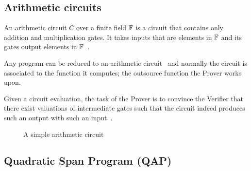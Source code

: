 \subsection{Arithmetic circuits}
\label{zkp:snarks:circuits}

An arithmetic circuit $C$ over a finite field $\mathbb{F}$ is a circuit that contains
only addition and multiplication gates. It takes inputs that are elements in $\mathbb{F}$ and its gates output elements in $\mathbb{F}$~\cite{184425, zcash}.

Any program  can be reduced to  an arithmetic circuit~\cite{pankova_succinct_2013, 10.1007/978-3-642-40084-1_6} and normally the circuit is associated to the function it computes; the outsource function the Prover works upon.

Given a circuit evaluation, the task of the Prover is to convince the Verifier that there exist valuations of intermediate gates such that the circuit indeed produces such an output with such an input~\cite{pankova_succinct_2013}.

\begin{figure}[ht!]
  \center
  \caption{A simple arithmetic circuit}
  \label{fig:zkp:circuit}
\end{figure}

\subsection{Quadratic Span Program (QAP)}
\label{zkp:snarks:qap}

